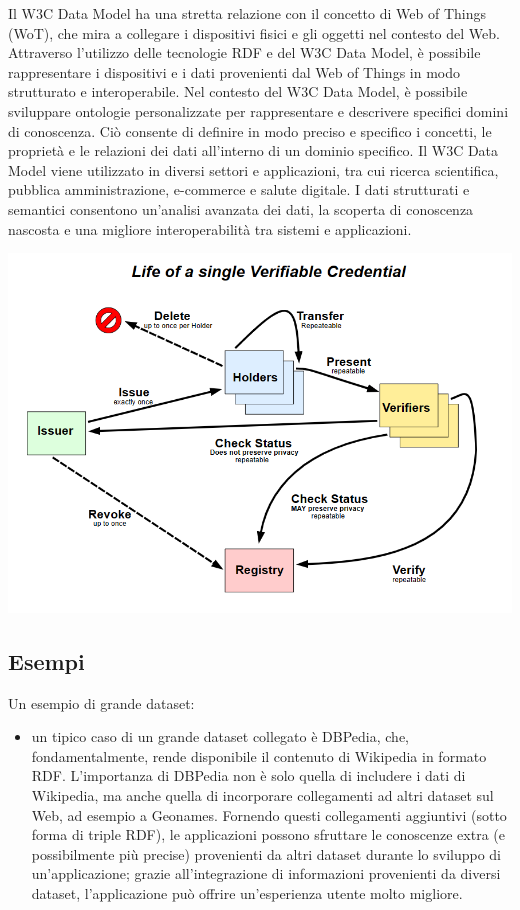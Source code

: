 Il W3C Data Model ha una stretta relazione con il concetto di Web of Things (WoT), che mira a collegare i dispositivi fisici e gli oggetti nel contesto del Web. Attraverso l'utilizzo delle tecnologie RDF e del W3C Data Model, è possibile rappresentare i dispositivi e i dati provenienti dal Web of Things in modo strutturato e interoperabile.
Nel contesto del W3C Data Model, è possibile sviluppare ontologie personalizzate per rappresentare e descrivere specifici domini di conoscenza. Ciò consente di definire in modo preciso e specifico i concetti, le proprietà e le relazioni dei dati all'interno di un dominio specifico.
Il W3C Data Model viene utilizzato in diversi settori e applicazioni, tra cui ricerca scientifica, pubblica amministrazione, e-commerce e salute digitale. I dati strutturati e semantici consentono un'analisi avanzata dei dati, la scoperta di conoscenza nascosta e una migliore interoperabilità tra sistemi e applicazioni.

\begin{center}
	\includegraphics[scale = 1]{./res/images/Immaginew3c.png}
\end{center}

\subsection{Esempi}
Un esempio di grande dataset:
\begin{itemize}
    \item un tipico caso di un grande dataset collegato è DBPedia, che, fondamentalmente, rende disponibile il contenuto di Wikipedia in formato RDF. L'importanza di DBPedia non è solo quella di includere i dati di Wikipedia, ma anche quella di incorporare collegamenti ad altri dataset sul Web, ad esempio a Geonames. Fornendo questi collegamenti aggiuntivi (sotto forma di triple RDF), le applicazioni possono sfruttare le conoscenze extra (e possibilmente più precise) provenienti da altri dataset durante lo sviluppo di un'applicazione; grazie all'integrazione di informazioni provenienti da diversi dataset, l'applicazione può offrire un'esperienza utente molto migliore.
\end{itemize}

